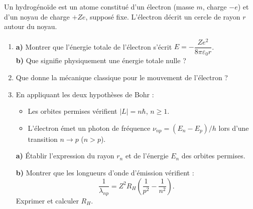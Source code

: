 \documentclass[12pt,a4paper]{article}
\begin{document}
\begin{boiteexercice}
Un hydrogénoïde est un atome constitué d'un électron (masse $m$, charge $-e$) et d'un noyau de
charge $+Ze$, supposé fixe. L'électron décrit un cercle de rayon $r$ autour du noyau.
\begin{enumerate}
  \item \textbf{a)} Montrer que l'énergie totale de l'électron s'écrit $E = -\dfrac{Ze^2}{8\pi\varepsilon_0 r}$.\\
        \textbf{b)} Que signifie physiquement une énergie totale nulle ?
  \item Que donne la mécanique classique pour le mouvement de l'électron ?
  \item En appliquant les deux hypothèses de Bohr :
    \begin{itemize}
      \item Les orbites permises vérifient $|L| = n\hbar$, $n \geq 1$.
      \item L'électron émet un photon de fréquence $\nu_{np} = (E_n-E_p)/h$ lors d'une transition
        $n \to p$ ($n > p$).
    \end{itemize}
    \textbf{a)} Établir l'expression du rayon $r_n$ et de
    l'énergie $E_n$ des orbites permises.

    \textbf{b)} Montrer que les longueurs d'onde d'émission vérifient :
    \[
    \dfrac{1}{\lambda_{np}} = Z^2 R_H\!\left(\dfrac{1}{p^2}-\dfrac{1}{n^2}\right).
    \]
    Exprimer et calculer $R_H$.
\end{enumerate}
\end{boiteexercice}
\end{document}
